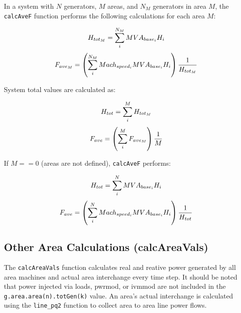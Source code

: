 \vspace{1em}
In a system with $N$ generators, $M$ areas, and $N_M$ generators in area $M$, the \verb|calcAveF| function performs the following calculations for each area $M$:

\begin{equation}{\label{eq: areaH} }
H_{tot_M} = \sum_{i}^{N_M} MVA_{base_i}H_i
\end{equation} 
\vspace{-1em}
\begin{equation}{\label{eq: areaF} }
F_{ave_M} = \left( \sum_{i}^{N_M}Mach_{speed_i}MVA_{base_i}H_i \right) \dfrac{1}{H_{tot_M}}
\end{equation}
\vspace{0.5 em}

\noindent System total values are calculated as:

\begin{equation}{\label{eq: systemH} }
H_{tot} = \sum_{i}^{M} H_{tot_M}
\end{equation} 
\vspace{-1em}
\begin{equation}{\label{eq: systemF} }
F_{ave} = \left( \sum_{i}^{M} F_{ave_M} \right) \dfrac{1}{M}
\end{equation}
\vspace{0.5 em}

\noindent If $M==0$ (areas are not defined), \verb|calcAveF| performs:

\begin{equation}{\label{eq: systemH2} }
H_{tot} = \sum_{i}^{N} MVA_{base_i}H_i 
\end{equation} 
\vspace{-1em}
\begin{equation}{\label{eq: systemF2} }
F_{ave} = \left( \sum_{i}^{N}Mach_{speed_i}MVA_{base_i}H_i \right) \dfrac{1}{H_{tot}}
\end{equation}\vspace{0.5 em}

\subsection{Other Area Calculations (calcAreaVals)}  
The \verb|calcAreaVals| function calculates real and reative power generated by all area machines and actual area interchange every time step.
It should be noted that power injected via loads, pwrmod, or ivmmod are not included in the \verb|g.area.area(n).totGen(k)| value.
An area's actual interchange is calculated using the \verb|line_pq2| function to collect area to area line power flows.
